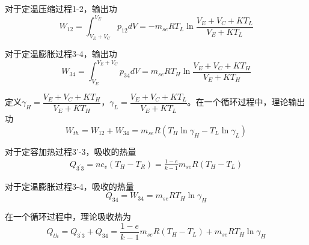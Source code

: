 对于定温压缩过程1-2，输出功
\begin{equation}
	W_{12} = \int^{V_E}_{V_E+V_C}{p_{12}dV}=-m_{se}RT_L\ln{\frac{V_E+V_C+KT_L}{V_E+KT_L}}
\end{equation}

对于定温膨胀过程3-4，输出功
\begin{equation}
	W_{34} = \int^{V_E+V_C}_{V_E}{p_{34}dV}=m_{se}RT_H\ln{\frac{V_E+V_C+KT_H}{V_E+KT_H}}
\end{equation}

定义$\gamma_H = \dfrac{V_E+V_C+KT_H}{V_E+KT_H}$，$\gamma_L = \dfrac{V_E+V_C+KT_L}{V_E+KT_L}$。在一个循环过程中，理论输出功
\begin{equation}
	W_{th} = W_{12} + W_{34} = m_{se}R(T_H\ln\gamma_H - T_L\ln\gamma_L)
\end{equation}

对于定容加热过程3'-3，吸收的热量
\begin{equation}
	\begin{split}
		Q_{3^{'}3} = nc_v(T_H-T_R)
		=\frac{1-e}{k-1}m_{se}R(T_H-T_L)
	\end{split}
\end{equation}


对于定温膨胀过程3-4，吸收的热量
\begin{equation}
	Q_{34} = W_{34} = m_{se}RT_H\ln\gamma_H
\end{equation}

在一个循环过程中，理论吸收热为
\begin{equation}
	Q_{th} = Q_{3^{'}3} + Q_{34} = \frac{1-e}{k-1}m_{se}R(T_H-T_L) + m_{se}RT_H\ln\gamma_H
\end{equation}

